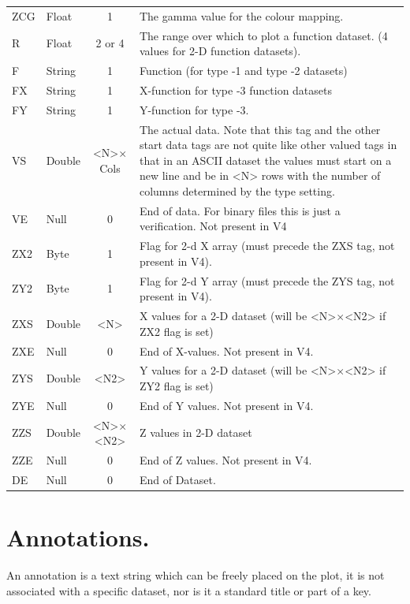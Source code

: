 \documentclass[english]{article}
\begin{document}
\begin{longtable}{|llcp{8cm}|}
  ZCG & Float & 1 & The gamma value for the colour mapping.\\
  R& Float& 2 or 4& The range over which to plot a function dataset. (4
  values for 2-D
  function datasets).\\
  F& String& 1&
  Function (for type -1 and type -2 datasets)\\
  FX& String& 1&
  X-function for type -3 function datasets\\
  FY& String& 1&
  Y-function for type -3.\\
  VS& Double& <N>$\times$Cols& The actual data. Note that this tag and
  the other start data tags are not quite like other valued tags in that
  in an ASCII dataset the values must start on a new line and be in <N>
  rows with the number of columns
  determined by the type setting.\\
  VE& Null& 0&
  End of data. For binary files this is just a verification. Not
  present in V4\\
  ZX2 & Byte & 1 & Flag for 2-d X array (must precede the ZXS tag, not
  present in V4).\\
  ZY2 & Byte & 1 & Flag for 2-d Y array (must precede the ZYS tag, not
  present in V4).\\
  ZXS& Double& <N>&
  X values for a 2-D dataset (will be <N>$\times$<N2> if ZX2 flag is set) \\
  ZXE& Null& 0&
  End of X-values. Not present in V4.\\
  ZYS& Double& <N2>&
  Y values for a 2-D dataset (will be <N>$\times$<N2> if ZY2 flag is set)\\
  ZYE& Null& 0&
  End of Y values. Not present in V4.\\
  ZZS& Double& <N>$\times$<N2>&
  Z values in 2-D dataset\\
  ZZE& Null& 0&
  End of Z values. Not present in V4.\\
  DE& Null& 0&
  End of Dataset.\\
\end{longtable}


\section{Annotations.}

An annotation is a text string which can be freely placed on the plot,
it is not associated with a specific dataset, nor is it a standard
title or part of a key.
\end{document}
